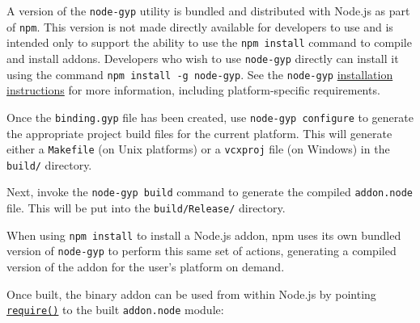 \begin{Shaded}
\begin{Highlighting}[]
\FunctionTok{\{}
  \FunctionTok{:} \OtherTok{[}
    \FunctionTok{\{}
      \FunctionTok{:} \FunctionTok{,}
      \FunctionTok{:} \OtherTok{[}  \OtherTok{]}
    \FunctionTok{\}}
  \OtherTok{]}
\FunctionTok{\}}
\end{Highlighting}
\end{Shaded}

A version of the \texttt{node-gyp} utility is bundled and distributed
with Node.js as part of \texttt{npm}. This version is not made directly
available for developers to use and is intended only to support the
ability to use the \texttt{npm\ install} command to compile and install
addons. Developers who wish to use \texttt{node-gyp} directly can
install it using the command \texttt{npm\ install\ -g\ node-gyp}. See
the \texttt{node-gyp}
\href{https://github.com/nodejs/node-gyp\#installation}{installation
instructions} for more information, including platform-specific
requirements.

Once the \texttt{binding.gyp} file has been created, use
\texttt{node-gyp\ configure} to generate the appropriate project build
files for the current platform. This will generate either a
\texttt{Makefile} (on Unix platforms) or a \texttt{vcxproj} file (on
Windows) in the \texttt{build/} directory.

Next, invoke the \texttt{node-gyp\ build} command to generate the
compiled \texttt{addon.node} file. This will be put into the
\texttt{build/Release/} directory.

When using \texttt{npm\ install} to install a Node.js addon, npm uses
its own bundled version of \texttt{node-gyp} to perform this same set of
actions, generating a compiled version of the addon for the user's
platform on demand.

Once built, the binary addon can be used from within Node.js by pointing
\href{modules.md\#requireid}{\texttt{require()}} to the built
\texttt{addon.node} module:

\begin{Shaded}
\begin{Highlighting}[]
\OperatorTok{=} \NormalTok{(}\NormalTok{)}\OperatorTok{;}

\NormalTok{())}\OperatorTok{;}
\end{Highlighting}
\end{Shaded}

